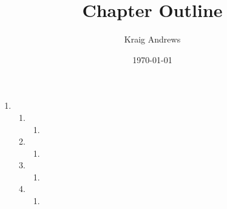\documentclass{article}
\author{Kraig Andrews}
\title{Chapter Outline}
\date{\today}
\begin{document}
\maketitle

\begin{enumerate}%

	\item{}
	\begin{enumerate}%
		\item{}
		\begin{enumerate}%
			\item{}
		\end{enumerate}%
		
		\item{}
		\begin{enumerate}%
			\item{}
		\end{enumerate}%
		
		\item{}
		\begin{enumerate}%
			\item{}
		\end{enumerate}%

		\item{}
		\begin{enumerate}%
			\item{}
		\end{enumerate}%
	\end{enumerate}%

\end{enumerate} %

%
%
\end{document}
